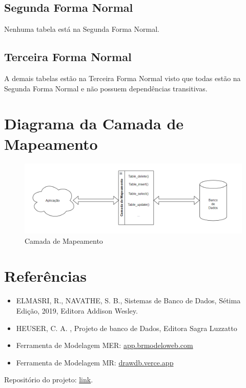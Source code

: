 \documentclass{article}
\begin{document}
\subsection{Segunda Forma Normal}
Nenhuma tabela está na Segunda Forma Normal.

\subsection{Terceira Forma Normal}
A demais tabelas estão na Terceira Forma Normal visto que todas estão na Segunda Forma Normal e não possuem dependências transitivas.

\section{Diagrama da Camada de Mapeamento}
\begin{figure}[!ht]
        \centering
        \includegraphics[width=1\textwidth]{imagens/mapeamento.png}
        \caption{Camada de Mapeamento}
\end{figure}

\section{Referências}
\begin{itemize}
        \item ELMASRI, R., NAVATHE, S. B., Sistemas de Banco de Dados, Sétima Edição, 2019, Editora Addison Wesley.
        \item HEUSER, C. A. , Projeto de banco de Dados, Editora Sagra Luzzatto
        \item Ferramenta de Modelagem MER: \href{https://app.brmodeloweb.com/#!/conceptual/66dd8939bb821248818df271}{app.brmodeloweb.com}
        \item Ferramenta de Modelagem MR: \href{https://drawdb.vercel.app/}{drawdb.verce.app}
\end{itemize}

Repositório do projeto: \href{https://github.com/qrno/BD-2024-1}{link}.
\end{document}
